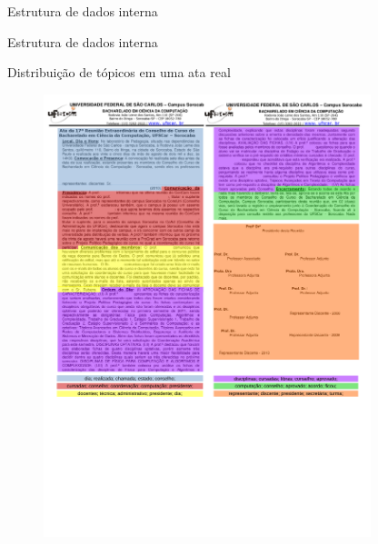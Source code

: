\documentclass[xcolor=table]{beamer}
\begin{document}
\begin{frame}{Estrutura de dados interna}



\end{frame}

\begin{frame}{Estrutura de dados interna}
\end{frame}












\begin{frame}{Distribuição de tópicos em uma ata real}

	\begin{figure}[h!]

		\includegraphics[trim={ 0 265 0 16 },clip,page=1,width=0.85\textwidth]{images/distribuicao.pdf}

	\end{figure}

\end{frame}
\end{document}
